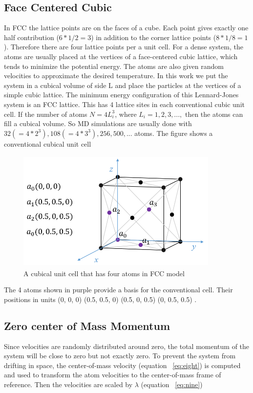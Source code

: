 \documentclass[]{article}
\begin{document}
\subsection{\label{sec:level2.2} Face Centered Cubic}
In FCC the lattice points are on the faces of a cube. Each point gives exactly one half contribution ($6*1/2 = 3$) in addition to the corner lattice points ($8*1/8 = 1$). Therefore there are four lattice points per a unit cell.
For a dense system, the atoms are usually placed at the vertices of a face-centered cubic lattice, which tends to minimize the potential energy. The atoms are also given random velocities to approximate the desired temperature. In this work we put the system in a cubical volume of side L and place the particles at the vertices of a simple cubic lattice.
The minimum energy configuration of this Lennard-Jones system is an FCC lattice. This has 4 lattice sites in each conventional cubic unit cell. If the number of atoms $N = 4L_i^3$, where $L_i = 1,2,3,...,$ then the atoms can fill a cubical volume. So MD simulations are usually done with $32 (= 4*2^3), 108 (= 4*3^3), 256, 500,...$ atoms.
The figure shows a conventional cubical unit cell

\begin{figure}[H]
  \centering
  \includegraphics[width=10cm,height=6cm]{figures/Fcc_Cubic}
  \caption{\label{fig:FCC} A cubical unit cell that has four atoms in FCC model }
\end{figure}

The 4 atoms shown in purple provide a basis for the conventional cell. Their positions in units (0, 0, 0)	(0.5, 0.5, 0)	(0.5, 0, 0.5)	(0, 0.5, 0.5) .
	
\subsection{\label{sec:level2.3} Zero center of Mass Momentum}
Since velocities are randomly distributed around zero, the total momentum of the system will be close to zero but not exactly zero. To prevent the system from drifting in space, the center-of-mass velocity (equation ~\ref{eq:eight}) is computed and used to transform the atom velocities to the center-of-mass frame of reference. Then the velocities are scaled by $\lambda$ (equation ~\ref{eq:nine})
\end{document}
